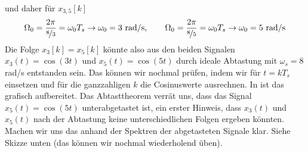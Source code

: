 \begin{ExCalc}
\begin{align}
\end{align}
und daher für $x_{3,5}[k]$
\begin{align}
\Omega_0 = \frac{2\pi}{\nicefrac{8}{3}} = \omega_0 T_s \rightarrow \omega_0 = 3 \text{ rad/s},\quad\quad
\Omega_0 = \frac{2\pi}{\nicefrac{8}{5}} = \omega_0 T_s \rightarrow \omega_0 = 5 \text{ rad/s}
\end{align}
%
Die Folge $x_3[k]=x_5[k]$ könnte also aus den beiden Signalen $x_3(t)=\cos(3 t)$
und $x_5(t) = \cos(5 t)$ durch ideale Abtastung mit $\omega_s = 8$ rad/s
entstanden sein.
Das können wir nochmal prüfen, indem wir für $t=k T_s$
einsetzen und für die ganzzahligen $k$ die Cosinuswerte ausrechnen.
In  ist das grafisch aufbereitet.
%
Das Abtasttheorem verrät uns, dass das Signal $x_5(t) = \cos(5 t)$ unterabgetastet
ist, ein erster Hinweis, dass $x_3(t)$ und $x_5(t)$ nach der Abtastung keine
unterschiedlichen Folgen ergeben könnten.
%
Machen wir uns das anhand der Spektren der abgetasteten Signale klar. Siehe Skizze
unten (das können wir nochmal wiederholend üben).
%
\begin{center}
\end{center}
\end{ExCalc}
